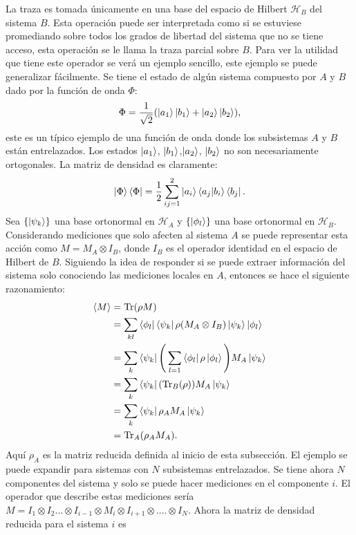 La traza es tomada únicamente en una base del espacio de Hilbert $\mathcal{H}_{B}$ del sistema $B$. Esta operación puede ser interpretada como si se estuviese promediando sobre todos los grados de libertad del sistema que no se tiene acceso, esta operación se le llama la traza parcial sobre $B$. Para ver la utilidad que tiene este operador se verá un ejemplo sencillo, este ejemplo se puede generalizar fácilmente.
Se tiene el estado de algún sistema compuesto por $A$ y $B$ dado por la función de onda $\Phi$:
\begin{equation}
\Phi = \frac{1}{\sqrt{2}} (\ket{a_{1}}\ket{b_{1}}+\ket{a_{2}}\ket{b_{2}}),
\end{equation}
este es un típico ejemplo de una función de onda donde los subsistemas $A$ y $B$ están entrelazados. Los estados $\ket{a_{1}}$, $\ket{b_{1}}$,$\ket{a_{2}}$, $\ket{b_{2}}$ no son necesariamente ortogonales. La matriz de densidad es claramente:
\begin{equation}
\ket{\Phi}\bra{\Phi} = \frac{1}{2}\sum_{ij=1}^{2} \ket{a_{i}}\bra{a_{j}} \ket{b_{i}}\bra{b_{j}} .
\end{equation}
Sea $ \{ \ket{\psi_{k}} \} $ una base ortonormal en $\mathcal{H}_{A}$ y  $ \{ \ket{\phi_{l}} \} $ una base ortonormal en $\mathcal{H}_{B}$. Considerando mediciones que solo afecten al sistema $A$ se puede representar esta acción como $M=M_{A} \otimes I_{B}$, donde $I_{B}$ es el operador identidad en el espacio de Hilbert de $B$. Siguiendo la idea de responder si se puede extraer información del sistema solo conociendo las mediciones locales en $A$, entonces se hace el siguiente razonamiento:
\begin{align}
\langle M \rangle &=  \Tr(\rho M)\\
\quad &=\sum_{kl} \bra{\phi_{l}}\bra{\psi_{k}}\rho(M_{A} \otimes I_{B})\ket{\psi_{k}} \ket{\phi_{l}}\\
\quad &=\sum_{k}\bra{\psi_{k}}  \Bigg( \sum_{l=1} \bra{\phi_{l}} \rho\ket{\phi_{l}} \Bigg) M_{A}\ket{\psi_{k}}\\
\quad &=\sum_{k}\bra{\psi_{k}} ( \Tr_{B}(\rho) )  M_{A}\ket{\psi_{k}}\\
\quad &=\sum_{k}\bra{\psi_{k}} \rho_{A}  M_{A}\ket{\psi_{k}}\\
\quad &= \Tr_{A} (\rho_{A} M_{A}).
\end{align}
Aquí $\rho_{A}$ es la matriz reducida definida al inicio de esta subsección. El ejemplo se puede expandir para sistemas con $N$ subsistemas entrelazados. Se tiene ahora $N$ componentes del sistema y solo se puede hacer mediciones en el componente $i$. El operador que describe estas mediciones sería $M= I_{1}\otimes I_{2} ... \otimes I_{i-1} \otimes M_{i} \otimes I_{i+1}\otimes .... \otimes I_{N}$. Ahora la matriz de densidad reducida para el sistema $i$ es
